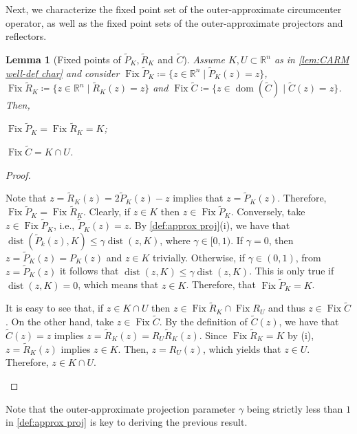 \documentclass[smallextended,numbook,nospthms]{svjour3}
\theoremstyle{plain}
\newtheorem{lemma}[theorem]{Lemma}
\theoremstyle{definition}
\def\RR{\mathds R}
\DeclareMathOperator{\Fix}{Fix}
\begin{document}
Next, we characterize the fixed point set of the outer-approximate circumcenter operator, as well as the fixed point sets of the outer-approximate projectors and reflectors.
\begin{lemma}[Fixed points of $\tilde{P}_{K}, \tilde{R}_{K}$ and $\tilde{C}$]\label{lem:CARM fix} 
	Assume $K, U \subset \RR^{n}$ as in  \cref{lem:CARM well-def char} and consider $\Fix \tilde{P}_{K}\coloneqq \{z \in \RR^{n} \mid \tilde{P}_{K}(z)=z\}$, $\Fix \tilde{R}_{K}\coloneqq \{z \in \RR^{n} \mid \tilde{R}_{K}(z)=z\}$ and $\Fix \tilde{C}\coloneqq \{z \in \operatorname{dom}(\tilde{C}) \mid \tilde{C}(z)=z\}$. Then,
	\begin{listi}
	\item $\Fix \tilde{P}_{K}=\Fix \tilde{R}_{K}=K$; 
	\item $\Fix \tilde{C}=K \cap U$.
	\end{listi}
\end{lemma}
	\begin{proof}
	\begin{listi}
	\item Note that $z=\tilde{R}_{K}(z) = 2\tilde{P}_{K}(z)-z$ implies that $z=\tilde{P}_{K}(z)$. Therefore, $\Fix \tilde{P}_{K}=\Fix \tilde{R}_{K}$. 
	Clearly, if $z \in K$ then $z \in\Fix \tilde{P}_{K}$. Conversely, take $z \in \Fix \tilde{P}_{K}$, i.e., $\tilde{P}_{K}(z)=z$.
    By \cref{def:approx proj}(i), we have that $\operatorname{dist}(\tilde{P}_{k}(z), K) \leq \gamma \operatorname{dist}(z, K)$, where $\gamma \in [0,1)$. If $\gamma=0$, then $z=\tilde{P}_{K}(z)=P_{K}(z)$ and $z \in K$ trivially. Otherwise, if $\gamma \in (0,1)$, from $z = \tilde{P}_{K}(z)$ it follows that $\operatorname{dist}(z, K) \leq \gamma \operatorname{dist}(z, K)$. This is only true if $\operatorname{dist}(z, K)=0$, which means that $z \in K$. Therefore, that $\Fix \tilde{P}_{K}=K$.
	\item It is easy to see that, if $z \in K \cap U$ then $z \in \Fix \tilde{R}_{K} \cap \Fix R_{U}$ and thus $z \in \Fix \tilde{C}$. On the other hand, take $z \in \Fix \tilde{C}$. By the definition of $\tilde{C}(z)$, we have that $\tilde{C}(z)=z$ implies $z=\tilde{R}_{K}(z)=R_{U}\tilde{R}_{K}(z)$. Since $\Fix \tilde{R}_{K}=K$ by (i), $z=\tilde{R}_{K}(z)$ implies $z \in K$. Then, $z=R_{U}(z)$, which yields that $z \in U$. Therefore, $z \in K \cap U$.
	\end{listi}
\end{proof}

Note that the outer-approximate projection parameter $\gamma$ being strictly less than $1$ in \cref{def:approx proj} is key to deriving the previous result.
\end{document}
